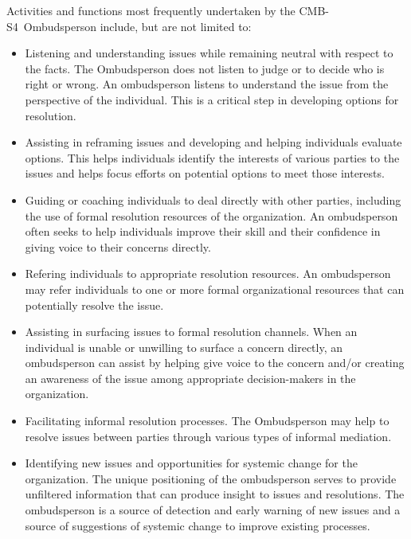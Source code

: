 \documentclass[12pt]{article}
\newcommand\collabname{CMB-S4}
\begin{document}
Activities and functions most frequently undertaken by the \collabname\ Ombudsperson include, but are not limited to:
\begin{itemize}
\item Listening and understanding issues while remaining neutral with respect to the facts. The Ombudsperson does not listen to judge or to decide who is right or wrong. An ombudsperson listens to understand the issue from the perspective of the individual. This is a critical step in developing options for resolution.
\item Assisting in reframing issues and developing and helping individuals evaluate options. This helps individuals identify the interests of various parties to the issues and helps focus efforts on potential options to meet those interests.
\item Guiding or coaching individuals to deal directly with other parties, including the use of formal resolution resources of the organization. An ombudsperson often seeks to help individuals improve their skill and their confidence in giving voice to their concerns directly.
\item Refering individuals to appropriate resolution resources. An ombudsperson may refer individuals to one or more formal organizational resources that can potentially resolve the issue.
\item Assisting in surfacing issues to formal resolution channels. When an individual is unable or unwilling to surface a concern directly, an ombudsperson can assist by helping give voice to the concern and/or creating an awareness of the issue among appropriate decision-makers in the organization.
\item Facilitating informal resolution processes. The Ombudsperson may help to resolve issues between parties through various types of informal mediation.
\item Identifying new issues and opportunities for systemic change for the organization. The unique positioning of the ombudsperson serves to provide unfiltered information that can produce insight to issues and resolutions. The ombudsperson is a source of detection and early warning of new issues and a source of suggestions of systemic change to improve existing processes.
\end{itemize}
\end{document}
